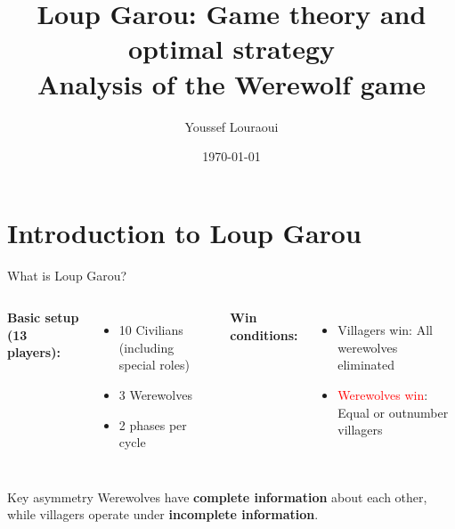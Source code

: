 \documentclass[10pt]{beamer}
\title[Loup Garou: Game theory \& optimal strategy]{
  \textbf{Loup Garou: Game theory and optimal strategy} \\
  \vspace{0.3cm}
  \small{Analysis of the Werewolf game}}
\author[Y. Louraoui]{Youssef Louraoui}
\date{\today}
\institute{}
\begin{document}
\begin{frame}
  \titlepage
\end{frame}


\section{Introduction to Loup Garou}

\begin{frame}{What is Loup Garou?}
  \begin{columns}[T]
    \textbf{Basic setup (13 players):}
    \begin{itemize}
      \item \alert{10 Civilians} (including special roles)
      \item \alert{3 Werewolves}
      \item 2 phases per cycle
    \end{itemize}
    
    \textbf{Win conditions:}
    \begin{itemize}
      \item {Villagers win}: All werewolves eliminated
      \item \textcolor{red}{Werewolves win}: Equal or outnumber villagers
    \end{itemize}
  \end{columns}

  \vspace{0.5cm}
  \begin{alertblock}{Key asymmetry}
    Werewolves have \textbf{complete information} about each other, while villagers operate under \textbf{incomplete information}.
  \end{alertblock}
\end{frame}
\end{document}
